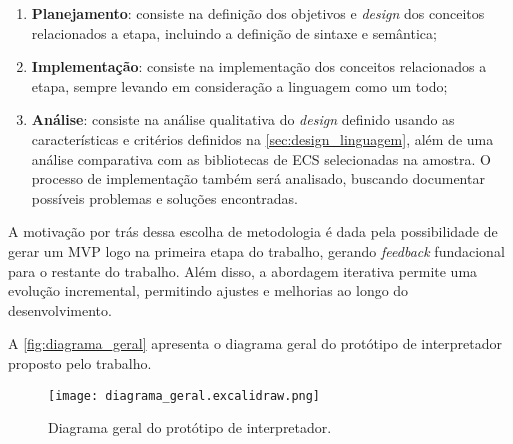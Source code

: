 \begin{enumerate}
    \item \textbf{Planejamento}: consiste na definição dos objetivos e \textit{design} dos conceitos relacionados a etapa, incluindo a definição de sintaxe e semântica;
    \item \textbf{Implementação}: consiste na implementação dos conceitos relacionados a etapa, sempre levando em consideração a linguagem como um todo;
    \item \textbf{Análise}: consiste na análise qualitativa do \textit{design} definido usando as características e critérios definidos na \autoref{sec:design_linguagem}, além de uma análise comparativa com as bibliotecas de ECS selecionadas na amostra. O processo de implementação também será analisado, buscando documentar possíveis problemas e soluções encontradas.
\end{enumerate}

A motivação por trás dessa escolha de metodologia é dada pela possibilidade de gerar um MVP logo na primeira etapa do trabalho, gerando \textit{feedback} fundacional para o restante do trabalho. Além disso, a abordagem iterativa permite uma evolução incremental, permitindo ajustes e melhorias ao longo do desenvolvimento.

A \autoref{fig:diagrama_geral} apresenta o diagrama geral do protótipo de interpretador proposto pelo trabalho.

\begin{figure}[H]
	\centering
	\texttt{[image: diagrama\_geral.excalidraw.png]}
	\caption{Diagrama geral do protótipo de interpretador.}
	\label{fig:diagrama_geral}
\end{figure}
